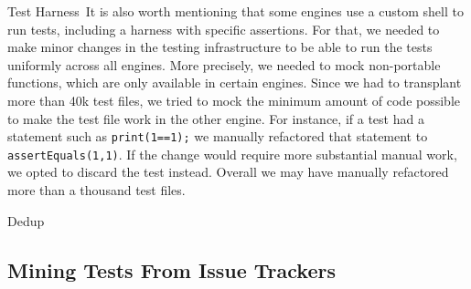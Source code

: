 \documentclass[smallextended]{svjour3}
\begin{document}
\lbrack{}Test Harness\rbrack{}~It is also worth mentioning that some
engines use a custom shell to run tests, including a harness with
specific assertions. For that, we
needed to make minor changes in the testing infrastructure to be able
to run the tests uniformly across all engines. More precisely, we
needed to mock non-portable functions, which are only available in
certain engines. Since we had to transplant more than 40k test files,
we tried to mock the minimum amount of code possible to make the test
file work in the other engine.  For instance, if a test had a statement such as
\texttt{print(1==1);} we manually refactored that statement to
\texttt{assertEquals(1,1)}.  If the change would require more
substantial manual work, we opted to discard the test instead. Overall
we may have manually refactored more than a thousand test files.

\lbrack{}Dedup\rbrack{}~

\subsection{Mining Tests From Issue Trackers}



\end{document}
